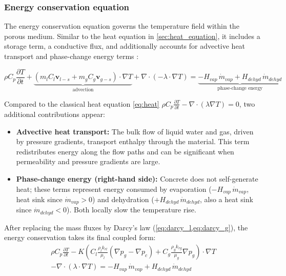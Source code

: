 \subsubsection{Energy conservation equation}

The energy conservation equation governs the temperature field within the porous medium. Similar to the heat equation in \cref{sec:heat_equation}, it includes a storage term, a conductive flux, and additionally accounts for advective heat transport and phase-change energy terms \cite{dauti2018}:

\begin{equation}
    \rho C_p \frac{\partial T}{\partial t} + \underbrace{\left(m_l C_l \mathbf{v}_{l-s} + m_g C_g \mathbf{v}_{g-s}\right) \cdot \nabla T}_{\text{advection}} + \nabla \cdot (-\lambda \cdot \nabla T) = \underbrace{-H_{vap}\,\dot{m}_{vap} + H_{dehyd}\,\dot{m}_{dehyd}}_{\text{phase-change energy}}
    \label{eq:energy_TH}
\end{equation}

Compared to the classical heat equation \cref{eq:heat} $\rho C_p \frac{\partial T}{\partial t} - \nabla \cdot (\lambda \nabla T) = 0$, two additional contributions appear:

\begin{itemize}
    \item \textbf{Advective heat transport:} The bulk flow of liquid water and gas, driven by pressure gradients, transport enthalpy through the material. This term redistributes energy along the flow paths and can be significant when permeability and pressure gradients are large.
    
    \item \textbf{Phase-change energy (right-hand side):} Concrete does not self-generate heat; these terms represent energy consumed by evaporation ($-H_{vap}\,\dot{m}_{vap}$, heat sink since $\dot{m}_{vap}>0$) and dehydration ($+H_{dehyd}\,\dot{m}_{dehyd}$, also a heat sink since $\dot{m}_{dehyd}<0$). Both locally slow the temperature rise.
\end{itemize}

After replacing the mass fluxes by Darcy's law (\cref{eq:darcy_l,eq:darcy_g}), the energy conservation takes its final coupled form:
\begin{equation}
\begin{split}
    \rho C_p \frac{\partial T}{\partial t} - K\left(C_l \frac{\rho_l k_{rl}}{\mu_l} \left(\nabla p_g - \nabla p_c\right) + C_g \frac{\rho_g k_{rg}}{\mu_g} \nabla p_g\right) \cdot \nabla T \\ - \nabla \cdot (\lambda \cdot \nabla T) = -H_{vap}\,\dot{m}_{vap} + H_{dehyd}\,\dot{m}_{dehyd}
\end{split}
\label{eq:energy_final}
\end{equation}

